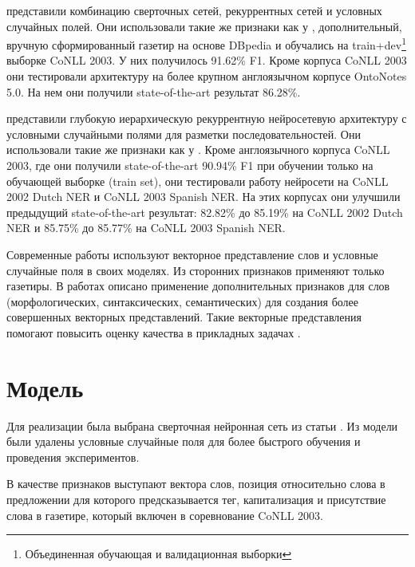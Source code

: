 \documentclass[a4paper,12pt]{article}
\begin{document}
  \citep{chiu2015named} представили комбинацию сверточных сетей, рекуррентных сетей
  и условных случайных полей.
  Они использовали такие же признаки как у \citep{collobert2011natural}, дополнительный, вручную сформированный
  газетир на основе DBpedia и обучались на
  train+dev\footnote{Объединенная обучающая и валидационная выборки} выборке CoNLL 2003.
  У них получилось 91.62\% F1. Кроме корпуса CoNLL 2003 они тестировали архитектуру
  на более крупном англоязычном корпусе OntoNotes 5.0. На нем они получили
  state-of-the-art результат 86.28\%.

  \citep{DBLP:journals/corr/YangSC16} представили глубокую иерархическую рекуррентную нейросетевую
  архитектуру с условными случайными полями для разметки последовательностей.
  Они использовали такие же признаки как у \citep{collobert2011natural}.
  Кроме англоязычного корпуса CoNLL 2003, где они получили state-of-the-art 90.94\% F1 при обучении
  только на обучающей выборке (train set), они тестировали работу нейросети на CoNLL 2002 Dutch NER и CoNLL 2003 Spanish NER.
  На этих корпусах они улучшили предыдущий state-of-the-art результат:
  82.82\% до 85.19\% на CoNLL 2002 Dutch NER и 85.75\% до 85.77\% на CoNLL 2003 Spanish NER.

  Современные работы используют векторное представление слов
  и условные случайные поля в своих моделях. Из сторонних признаков применяют
  только газетиры. В работах \citep{xu2014rc, bian2014knowledge} описано применение дополнительных признаков для
  слов (морфологических, синтаксических, семантических) для создания более
  совершенных векторных представлений.
  Такие векторные представления помогают повысить оценку качества в
  прикладных задачах \citep{xu2014rc}.

\section{Модель}

  Для реализации была выбрана сверточная нейронная сеть из статьи \citep{collobert2011natural}.
  Из модели были удалены условные случайные поля для более быстрого обучения и проведения экспериментов.

  В качестве признаков выступают вектора слов, позиция относительно слова в предложении
  для которого предсказывается тег, капитализация и присутствие слова в газетире,
  который включен в соревнование CoNLL 2003.
\end{document}
